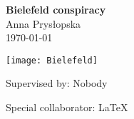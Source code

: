 \begin{titlepage}
\begin{center}

{\Huge \textbf{Bielefeld conspiracy}}\\

{\Huge Anna Prysłopska}\\

{\Huge \today}
\vfill

\texttt{[image: Bielefeld]}
\vfill

Supervised by: Nobody

Special collaborator: \LaTeX

\end{center}
\end{titlepage}